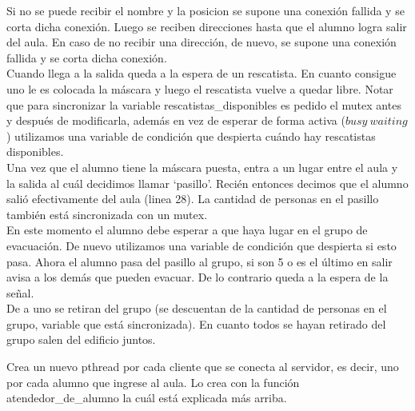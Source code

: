 \begin{algorithmic}[1]
     \Else
     \EndIf
   
   \Statex
 \EndProcedure
\end{algorithmic} 
\smallskip
Si no se puede recibir el nombre y la posicion se supone una conexión fallida y se corta dicha conexión.
Luego se reciben direcciones hasta que el alumno logra salir del aula. En caso de no recibir una dirección, 
de nuevo, se supone una conexión fallida y se corta dicha conexión. \\

Cuando llega a la salida queda a la espera de un rescatista. En cuanto consigue uno le es colocada la máscara y luego
el rescatista vuelve a quedar libre. Notar que para sincronizar la variable rescatistas\_disponibles 
es pedido el mutex antes y después de modificarla, además en vez de esperar de forma activa ($busy\ waiting$)
utilizamos una variable de condición que despierta cuándo hay rescatistas disponibles.\\

Una vez que el alumno tiene la máscara puesta, entra a un lugar entre el aula y la salida al cuál decidimos llamar 
\textquoteleft pasillo\textquoteright. Recién entonces decimos que el alumno salió efectivamente del aula (linea 28).
La cantidad de personas en el pasillo también está sincronizada con un mutex.\\

En este momento el alumno debe esperar a que haya lugar en el grupo de evacuación. De nuevo utilizamos una variable
de condición que despierta si esto pasa. Ahora el alumno pasa del pasillo al grupo, si son 5 o es el último en salir
avisa a los demás que pueden evacuar. De lo contrario queda a la espera de la señal.\\
De a uno se retiran del grupo (se descuentan de la cantidad de personas en el grupo, variable que está sincronizada).
En cuanto todos se hayan retirado del grupo salen del edificio juntos.
\bigskip

\begin{algorithmic}[1] 
     \EndIf
   \EndFor
 \EndFunction
\end{algorithmic}
\smallskip
Crea un nuevo pthread por cada cliente que se conecta al servidor, es decir, uno por cada alumno que ingrese al aula.
Lo crea con la función atendedor\_de\_alumno la cuál está explicada más arriba.